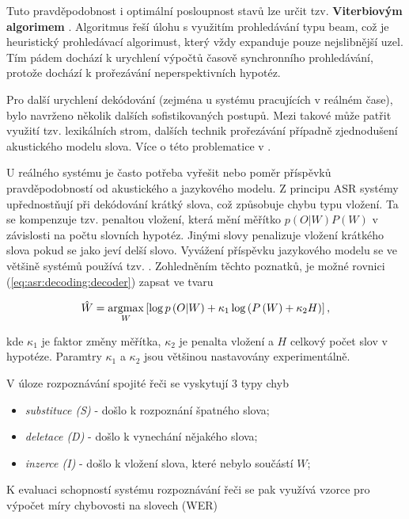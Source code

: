 \noindent Tuto pravděpodobnost i optimální posloupnost stavů lze určit tzv. \textbf{Viterbiovým algorimem} \cite{Holmes2001}. Algoritmus řeší úlohu s využitím prohledávání typu beam, což je heuristický prohledávací algorimust, který vždy expanduje pouze nejslibnější uzel. Tím pádem dochází k urychlení výpočtů časově synchronního prohledávání, protože dochází k prořezávání neperspektivních hypotéz.

Pro další urychlení dekódování (zejména u systému pracujících v reálném čase), bylo navrženo několik dalších sofistikovaných postupů. Mezi takové může patřit využití tzv. lexikálních strom, dalších technik prořezávání případně zjednodušení akustického modelu slova. Více o této problematice v \cite{Psutka2006}.

U reálného systému je často potřeba vyřešit nebo  poměr příspěvků pravděpodobností od akustického a jazykového modelu. Z principu ASR systémy upřednostňují při dekódování krátký slova, což způsobuje chybu typu vložení. Ta se kompenzuje tzv. penaltou vložení, která mění měřítko $p(O|W)P(W)$ v závislosti na počtu slovních hypotéz. Jinými slovy penalizuje vložení krátkého slova pokud se jako  jeví delší slovo. Vyvážení příspěvku jazykového modelu se ve většině systémů používá tzv. . Zohledněním těchto poznatků, je možné rovnici (\ref{eq:asr:decoding:decoder}) zapsat ve tvaru

\begin{equation}
  \hat{W} = \operatorname*{argmax}_{W} \left[\log p\left(O|W\right) + \kappa_1 \log\left(P\left(W\right) + \kappa_2H\right)\right],
  \label{eq:asr:decoding:compensated}
\end{equation}

\noindent kde $\kappa_1$ je faktor změny měřítka, $\kappa_2$ je penalta vložení a $H$ celkový počet slov v hypotéze. Paramtry $\kappa_1$ a $\kappa_2$ jsou většinou nastavovány experimentálně.

V úloze rozpoznávání spojité řeči se vyskytují 3 typy chyb

\begin{itemize}
  \item \textit{substituce (S)} - došlo k rozpoznání špatného slova;
  \item \textit{deletace (D)} - došlo k vynechání nějakého slova;
  \item \textit{inzerce (I)} - došlo k vložení slova, které nebylo součástí $W$;
\end{itemize}

\noindent K evaluaci schopností systému rozpoznávání řeči se pak využívá vzorce pro výpočet míry chybovosti na slovech (WER)

